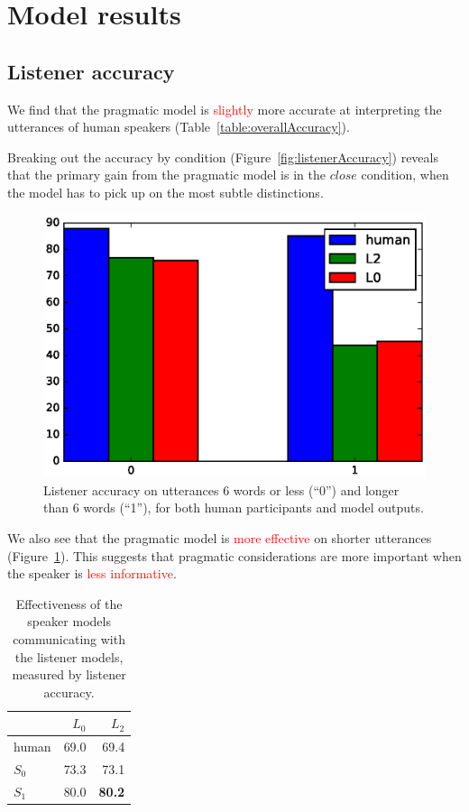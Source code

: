 \documentclass[11pt,letterpaper]{article}
\newcommand{\Listener}{L}
\newcommand{\Speaker}{S}
\renewcommand{\|}{\mid}
\newcommand{\best}[1]{\textbf{#1}}
\newcommand{\figref}[1]{Figure~\ref{#1}}
\newcommand{\tabref}[1]{Table~\ref{#1}}
\newcommand{\todocheck}[1]{\textcolor{red}{#1}}
\begin{document}
\section{Model results}

\subsection{Listener accuracy}

We find that the pragmatic model is \todocheck{slightly} more accurate at interpreting the
utterances of human speakers (\tabref{table:overallAccuracy}).

Breaking out the accuracy by condition (\figref{fig:listenerAccuracy}) reveals that
the primary gain from the pragmatic model is in the $close$ condition, when the
model has to pick up on the most subtle distinctions.

\begin{figure}
\centering
\includegraphics[width=0.8\columnwidth]{figures/byLength.eps}
\caption{Listener accuracy on utterances 6 words or less (``0'') and longer than
6 words (``1''), for both human participants and model outputs.}
\label{fig:byLength}
\end{figure}

We also see that the pragmatic model is \todocheck{more effective} on shorter utterances
(\figref{fig:byLength}). This suggests that pragmatic considerations are more
important when the speaker is \todocheck{less informative}.

\begin{table}[t]
\centering
\begin{tabular}{lrr}
  \hline
   & $\Listener_0$ & $\Listener_2$  \\
  \hline
  human        & 69.0 &       69.4  \\
  \hline
  $\Speaker_0$ & 73.3 &       73.1  \\
  $\Speaker_1$ & 80.0 & \best{80.2} \\
  \hline
\end{tabular}
\caption{Effectiveness of the speaker models communicating with the listener models,
measured by listener accuracy.}
\label{table:speakerVsListener}
\end{table}
\end{document}
